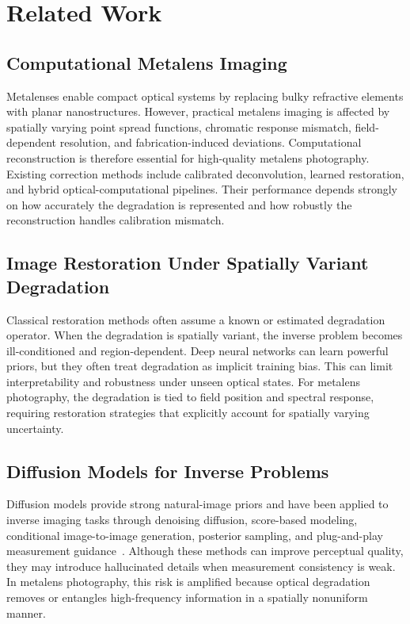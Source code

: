 \documentclass[journal]{IEEEtran}
\begin{document}
\section{Related Work}
\subsection{Computational Metalens Imaging}
Metalenses enable compact optical systems by replacing bulky refractive elements with planar nanostructures. However, practical metalens imaging is affected by spatially varying point spread functions, chromatic response mismatch, field-dependent resolution, and fabrication-induced deviations. Computational reconstruction is therefore essential for high-quality metalens photography. Existing correction methods include calibrated deconvolution, learned restoration, and hybrid optical-computational pipelines. Their performance depends strongly on how accurately the degradation is represented and how robustly the reconstruction handles calibration mismatch.

\subsection{Image Restoration Under Spatially Variant Degradation}
Classical restoration methods often assume a known or estimated degradation operator. When the degradation is spatially variant, the inverse problem becomes ill-conditioned and region-dependent. Deep neural networks can learn powerful priors, but they often treat degradation as implicit training bias. This can limit interpretability and robustness under unseen optical states. For metalens photography, the degradation is tied to field position and spectral response, requiring restoration strategies that explicitly account for spatially varying uncertainty.

\subsection{Diffusion Models for Inverse Problems}
Diffusion models provide strong natural-image priors and have been applied to inverse imaging tasks through denoising diffusion, score-based modeling, conditional image-to-image generation, posterior sampling, and plug-and-play measurement guidance~\cite{ho2020ddpm,song2021score,saharia2022palette,kawar2022ddrm,chung2023dps}. Although these methods can improve perceptual quality, they may introduce hallucinated details when measurement consistency is weak. In metalens photography, this risk is amplified because optical degradation removes or entangles high-frequency information in a spatially nonuniform manner.
\end{document}
